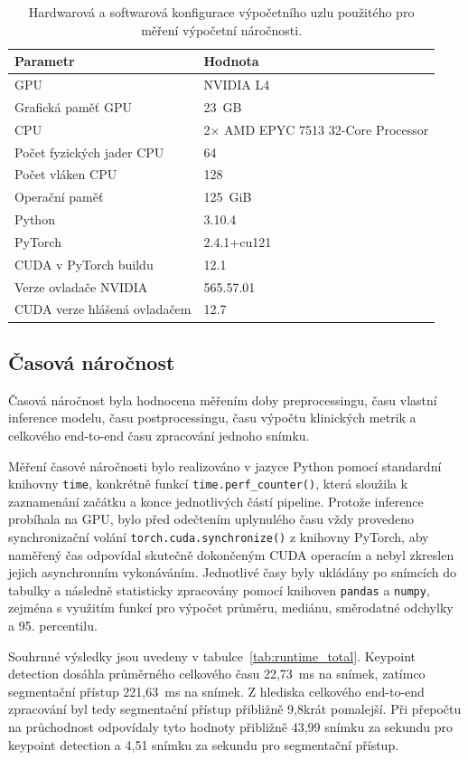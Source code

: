 \documentclass[male,czech,api_bc]{kitheses}
\begin{document}
\begin{table}[htbp]
\centering
\caption{Hardwarová a softwarová konfigurace výpočetního uzlu použitého pro měření výpočetní náročnosti.}
\label{tab:runtime_hw_sw}
\begin{tabular}{ll}
\hline
Parametr & Hodnota \\
\hline
GPU & NVIDIA L4 \\
Grafická paměť GPU & 23~GB \\
CPU & 2$\times$ AMD EPYC 7513 32-Core Processor \\
Počet fyzických jader CPU & 64 \\
Počet vláken CPU & 128 \\
Operační paměť & 125~GiB \\
Python & 3.10.4 \\
PyTorch & 2.4.1+cu121 \\
CUDA v PyTorch buildu & 12.1 \\
Verze ovladače NVIDIA & 565.57.01 \\
CUDA verze hlášená ovladačem & 12.7 \\
\hline
\end{tabular}
\end{table}

\subsection{Časová náročnost}

Časová náročnost byla hodnocena měřením doby preprocessingu, času vlastní inference modelu, času postprocessingu, času výpočtu klinických metrik a celkového end-to-end času zpracování jednoho snímku.

Měření časové náročnosti bylo realizováno v jazyce Python pomocí standardní knihovny \texttt{time}, konkrétně funkcí \texttt{time.perf\_counter()}, která sloužila k zaznamenání začátku a konce jednotlivých částí pipeline. Protože inference probíhala na GPU, bylo před odečtením uplynulého času vždy provedeno synchronizační volání \texttt{torch.cuda.synchronize()} z knihovny PyTorch, aby naměřený čas odpovídal skutečně dokončeným CUDA operacím a nebyl zkreslen jejich asynchronním vykonáváním. Jednotlivé časy byly ukládány po snímcích do tabulky a následně statisticky zpracovány pomocí knihoven \texttt{pandas} a \texttt{numpy}, zejména s využitím funkcí pro výpočet průměru, mediánu, směrodatné odchylky a 95. percentilu.

Souhrnné výsledky jsou uvedeny v tabulce~\ref{tab:runtime_total}. Keypoint detection dosáhla průměrného celkového času 22{,}73~ms na snímek, zatímco segmentační přístup 221{,}63~ms na snímek. Z hlediska celkového end-to-end zpracování byl tedy segmentační přístup přibližně 9{,}8krát pomalejší. Při přepočtu na průchodnost odpovídaly tyto hodnoty přibližně 43{,}99 snímku za sekundu pro keypoint detection a 4{,}51 snímku za sekundu pro segmentační přístup.
\end{document}
